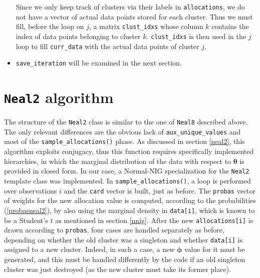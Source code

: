 \begin{itemize}
	Since we only keep track of clusters via their labels in \verb|allocations|, we do not have a vector of actual data points stored for each cluster.
	Thus we must fill, before the loop on $j$, a matrix \verb|clust_idxs| whose column $k$ contains the index of data points belonging to cluster $k$.
	\verb|clust_idxs| is then used in the $j$ loop to fill \verb|curr_data| with the actual data points of cluster $j$.
	\item \verb|save_iteration| will be examined in the next section.
\end{itemize}

\section{\texttt{Neal2} algorithm}
The structure of the \verb|Neal2| class is similar to the one of \verb|Neal8| described above.
The only relevant differences are the obvious lack of \verb|aux_unique_values| and most of the \verb|sample_allocations()| phase.
As discussed in section \ref{neal2}, this algorithm exploits conjugacy, thus this function requires specifically implemented hierarchies, in which the marginal distribution of the data with respect to $\boldsymbol\theta$ is provided in closed form.
In our case, a Normal-NIG specialization for the \verb|Neal2| template class was implemented.
In \verb|sample_allocations()|, a loop is performed over observations $i$ and the \verb|card| vector is built, just as before.
The \verb|probas| vector of weights for the new allocation value is computed, according to the probabilities (\ref{probasneal2}), by also using the marginal density in \verb|data[i]|, which is known to be a Student's $t$ as mentioned in section \ref{nnig}.
After the new \verb|allocations[i]| is drawn according to \verb|probas|, four cases are handled separately as before, depending on whether the old cluster was a singleton and whether \verb|data[i]| is assigned to a new cluster.
Indeed, in such a case, a new $\boldsymbol\phi$ value for it must be generated, and this must be handled differently by the code if an old singleton cluster was just destroyed (as the new cluster must take its former place).
